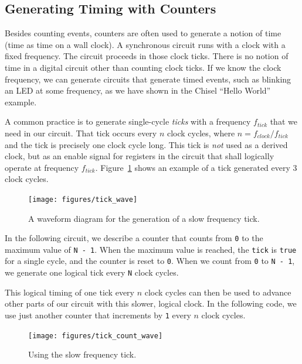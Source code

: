 \documentclass[%
    10pt,
    headinclude, footexclude,
    openright, %
    notitlepage,
    cleardoubleempty,
    headsepline,
    pointlessnumbers,
    bibtotoc, idxtotoc,
    ]{scrbook}
\newcommand{\code}[1]{{\lstinline[basicstyle=\small\ttfamily]{#1}}}
\begin{document}
\subsection{Generating Timing with Counters}
\label{sec:gen:timing}


Besides counting events, counters are often used to generate a notion of time
(time as time on a wall clock).
A synchronous circuit runs with a clock with a fixed frequency.
The circuit proceeds in those clock ticks. There is no notion of time in a digital
circuit other than counting clock ticks. If we know the clock frequency, we
can generate circuits that generate timed events, such as blinking an LED
at some frequency, as we have shown in the Chisel ``Hello World'' example.

A common practice is to generate single-cycle \emph{ticks} with a frequency $f_{tick}$
that we need in our circuit. That tick occurs every $n$ clock cycles,
where $n = f_{clock}/f_{tick}$ and the tick is precisely one clock cycle long.
This tick is \emph{not} used as a derived clock, but as an enable signal for
registers in the circuit that shall logically operate at frequency $f_{tick}$.
Figure~\ref{fig:tick-wave} shows an example of a tick generated every
3 clock cycles.

\begin{figure}
  \centering
  \texttt{[image: figures/tick\_wave]}
  \caption{A waveform diagram for the generation of a slow frequency tick.}
  \label{fig:tick-wave}
\end{figure}


In the following circuit, we describe a counter that counts from \code{0}
to the maximum value of \code{N - 1}. When the maximum value is reached,
the \code{tick} is \code{true} for a single cycle, and the counter is reset to \code{0}.
When we count from \code{0} to \code{N - 1}, we generate one logical tick
every \code{N} clock cycles.


\noindent This logical timing of one tick every $n$ clock cycles can then be used
to advance other parts of our circuit with this slower, logical clock.
In the following code, we use just another counter that increments by \code{1}
every $n$ clock cycles.


\begin{figure}
  \centering
  \texttt{[image: figures/tick\_count\_wave]}
  \caption{Using the slow frequency tick.}
  \label{fig:tick-count-wave}
\end{figure}
\end{document}
